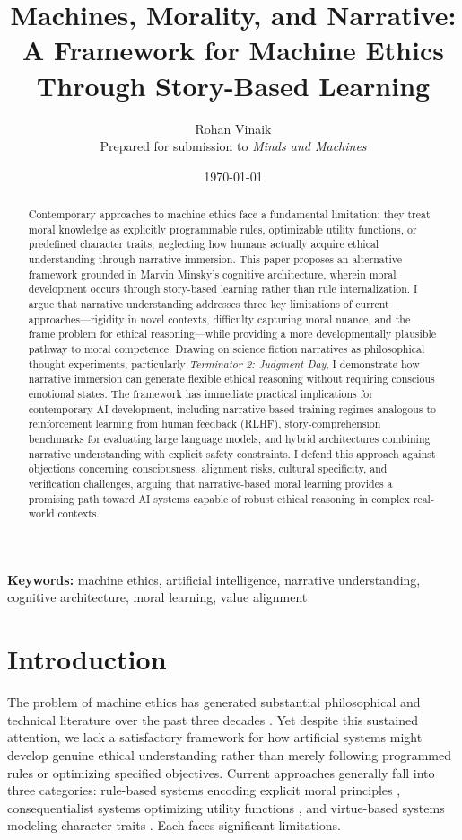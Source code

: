 \documentclass[12pt]{article}
\title{Machines, Morality, and Narrative: A Framework for Machine Ethics Through Story-Based Learning}
\author{Rohan Vinaik\\
\small Prepared for submission to \textit{Minds and Machines}}
\date{\today}
\begin{document}
\maketitle

\begin{abstract}
Contemporary approaches to machine ethics face a fundamental limitation: they treat moral knowledge as explicitly programmable rules, optimizable utility functions, or predefined character traits, neglecting how humans actually acquire ethical understanding through narrative immersion. This paper proposes an alternative framework grounded in Marvin Minsky's cognitive architecture, wherein moral development occurs through story-based learning rather than rule internalization. I argue that narrative understanding addresses three key limitations of current approaches---rigidity in novel contexts, difficulty capturing moral nuance, and the frame problem for ethical reasoning---while providing a more developmentally plausible pathway to moral competence. Drawing on science fiction narratives as philosophical thought experiments, particularly \textit{Terminator 2: Judgment Day}, I demonstrate how narrative immersion can generate flexible ethical reasoning without requiring conscious emotional states. The framework has immediate practical implications for contemporary AI development, including narrative-based training regimes analogous to reinforcement learning from human feedback (RLHF), story-comprehension benchmarks for evaluating large language models, and hybrid architectures combining narrative understanding with explicit safety constraints. I defend this approach against objections concerning consciousness, alignment risks, cultural specificity, and verification challenges, arguing that narrative-based moral learning provides a promising path toward AI systems capable of robust ethical reasoning in complex real-world contexts.
\end{abstract}

\noindent\textbf{Keywords:} machine ethics, artificial intelligence, narrative understanding, cognitive architecture, moral learning, value alignment

\section{Introduction}

The problem of machine ethics has generated substantial philosophical and technical literature over the past three decades \citep{wallach2008moral, anderson2011machine, allen2005artificial, moor2006nature}. Yet despite this sustained attention, we lack a satisfactory framework for how artificial systems might develop genuine ethical understanding rather than merely following programmed rules or optimizing specified objectives. Current approaches generally fall into three categories: rule-based systems encoding explicit moral principles \citep{gips1995towards, anderson2008geneth}, consequentialist systems optimizing utility functions \citep{abel2016reinforcement, russell2019human}, and virtue-based systems modeling character traits \citep{howard2001computational, vallor2016technology}. Each faces significant limitations.
\end{document}
